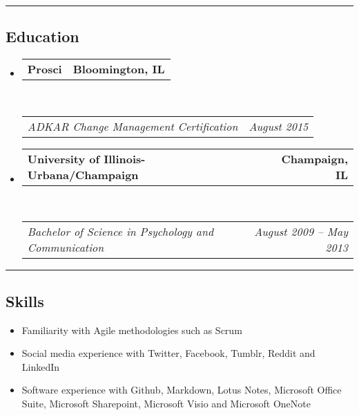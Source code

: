 \documentclass[10pt,letterpaper]{article}
\makeatletter
\newcommand{\headerrow}[2]
{\begin{tabular*}{\linewidth}{l@{\extracolsep{\fill}}r}
	#1 &
	#2 \\
\end{tabular*}}
\makeatother
\begin{document}
\hrule
\vspace{-0.4em}
\subsection*{Education}

\begin{itemize}
	\parskip=0.1em

	\item
	\headerrow
		{\textbf{Prosci}}
		{\textbf{Bloomington, IL}}
	\\
	\headerrow
		{\emph{ADKAR Change Management Certification}}
		{\emph{August 2015}}

	\item
	\headerrow
		{\textbf{University of Illinois-Urbana/Champaign}}
		{\textbf{Champaign, IL}}
	\\
	\headerrow
		{\emph{Bachelor of Science in Psychology and Communication}}
		{\emph{August 2009 -- May 2013}}

\end{itemize}

\hrule
\vspace{-0.4em}
\subsection*{Skills}

\begin{itemize}
        \item Familiarity with Agile methodologies such as Scrum
	\item Social media experience with Twitter, Facebook, Tumblr, Reddit and LinkedIn
        \item Software experience with Github, Markdown, Lotus Notes, Microsoft Office Suite, Microsoft
        Sharepoint, Microsoft Visio and Microsoft OneNote
\end{itemize}
\end{document}
